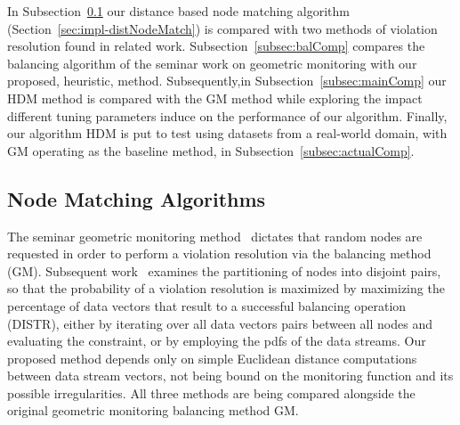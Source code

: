 In Subsection~\ref{subsec:matchingComp} our distance based node matching algorithm (Section~\ref{sec:impl-distNodeMatch}) is compared with two methods of violation resolution found in related work. Subsection~\ref{subsec:balComp} compares the balancing algorithm of the seminar work on geometric monitoring with our proposed, heuristic, method. Subsequently,in Subsection~\ref{subsec:mainComp} our HDM method is compared with the GM method while exploring the impact different tuning parameters induce on the performance of our algorithm. Finally, our algorithm HDM is put to test using datasets from a real-world domain, with GM operating as the baseline method, in Subsection~\ref{subsec:actualComp}.

\subsection{Node Matching Algorithms} \label{subsec:matchingComp}

The seminar geometric monitoring method~\cite{Sharfman2006GM} dictates that random nodes are requested in order to perform a violation resolution via the balancing method (GM). Subsequent work~\cite{Keren2014GMHetStreams} examines the partitioning of nodes into disjoint pairs, so that the probability of a violation resolution is maximized by maximizing the percentage of data vectors that result to a successful balancing operation (DISTR), either by iterating over all data vectors pairs between all nodes and evaluating the constraint, or by employing the pdfs of the data streams. Our proposed method depends only on simple Euclidean distance computations between data stream vectors, not being bound on the monitoring function and its possible irregularities. All three methods are being compared alongside the original geometric monitoring balancing method GM.

